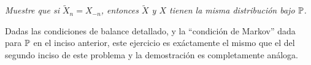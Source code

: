 \emph{
    Muestre que si $\tilde X_n = X_{-n}$, entonces $\tilde X$ y $X$ tienen la misma distribución bajo $\P$.
}

Dadas las condiciones de balance detallado, y la ``condición de Markov'' dada para $\P$ en el inciso anterior, 
este ejercicio es exáctamente el mismo que el del segundo inciso de este problema y la demostración es 
completamente análoga.
